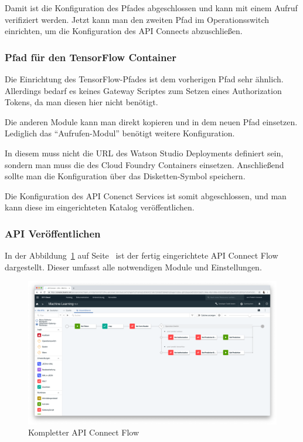 Damit ist die Konfiguration des Pfades abgeschlossen und kann mit einem Aufruf verifiziert werden. Jetzt kann man den
zweiten Pfad im Operationsswitch einrichten, um die Konfiguration des API Connects abzuschließen.

\subsubsection*{Pfad für den TensorFlow Container}
Die Einrichtung des TensorFlow-Pfades ist dem vorherigen Pfad sehr ähnlich. Allerdings bedarf es keines Gateway Scriptes
zum Setzen eines Authorization Tokens, da man diesen hier nicht benötigt.

Die anderen Module kann man direkt kopieren und in dem neuen Pfad einsetzen. Lediglich das \enquote{Aufrufen-Modul}
benötigt weitere Konfiguration.

In diesem muss nicht die URL des Watson Studio Deployments definiert sein, sondern man muss die des Cloud
Foundry Containers einsetzen. Anschließend sollte man die Konfiguration über das Disketten-Symbol speichern.

Die Konfiguration des API Conenct Services ist somit abgeschlossen, und man kann diese im eingerichteten Katalog
veröffentlichen.

\subsubsection{API Veröffentlichen}
In der Abbildung~\ref{fig:umsetzung_api_connect} auf Seite~\pageref{fig:umsetzung_api_connect} ist der fertig
eingerichtete API Connect Flow dargestellt. Dieser umfasst alle notwendigen Module und Einstellungen.

\begin{figure}[h]
    \centering
    \includegraphics[width=\textwidth]{images/kapitel_3/api_connect.png}
    \caption{Kompletter API Connect Flow}
    \label{fig:umsetzung_api_connect}
\end{figure}

